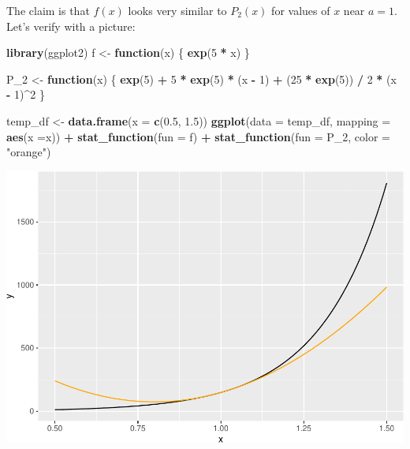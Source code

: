 \documentclass[]{article}
\newenvironment{Shaded}{\begin{snugshade}}{\end{snugshade}}
\newcommand{\KeywordTok}[1]{\textcolor[rgb]{0.13,0.29,0.53}{\textbf{#1}}}
\newcommand{\DataTypeTok}[1]{\textcolor[rgb]{0.13,0.29,0.53}{#1}}
\newcommand{\DecValTok}[1]{\textcolor[rgb]{0.00,0.00,0.81}{#1}}
\newcommand{\FloatTok}[1]{\textcolor[rgb]{0.00,0.00,0.81}{#1}}
\newcommand{\StringTok}[1]{\textcolor[rgb]{0.31,0.60,0.02}{#1}}
\newcommand{\ControlFlowTok}[1]{\textcolor[rgb]{0.13,0.29,0.53}{\textbf{#1}}}
\newcommand{\OperatorTok}[1]{\textcolor[rgb]{0.81,0.36,0.00}{\textbf{#1}}}
\newcommand{\NormalTok}[1]{#1}
\begin{document}
The claim is that \(f(x)\) looks very similar to \(P_2(x)\) for values
of \(x\) near \(a = 1\). Let's verify with a picture:

\begin{Shaded}
\begin{Highlighting}[]
\KeywordTok{library}\NormalTok{(ggplot2)}
\NormalTok{f <-}\StringTok{ }\ControlFlowTok{function}\NormalTok{(x) \{}
  \KeywordTok{exp}\NormalTok{(}\DecValTok{5} \OperatorTok{*}\StringTok{ }\NormalTok{x)}
\NormalTok{\}}

\NormalTok{P_}\DecValTok{2}\NormalTok{ <-}\StringTok{ }\ControlFlowTok{function}\NormalTok{(x) \{}
  \KeywordTok{exp}\NormalTok{(}\DecValTok{5}\NormalTok{) }\OperatorTok{+}\StringTok{ }\DecValTok{5} \OperatorTok{*}\StringTok{ }\KeywordTok{exp}\NormalTok{(}\DecValTok{5}\NormalTok{) }\OperatorTok{*}\StringTok{ }\NormalTok{(x }\OperatorTok{-}\StringTok{ }\DecValTok{1}\NormalTok{) }\OperatorTok{+}\StringTok{ }\NormalTok{(}\DecValTok{25} \OperatorTok{*}\StringTok{ }\KeywordTok{exp}\NormalTok{(}\DecValTok{5}\NormalTok{)) }\OperatorTok{/}\StringTok{ }\DecValTok{2} \OperatorTok{*}\StringTok{ }\NormalTok{(x }\OperatorTok{-}\StringTok{ }\DecValTok{1}\NormalTok{)}\OperatorTok{^}\DecValTok{2}
\NormalTok{\}}

\NormalTok{temp_df <-}\StringTok{ }\KeywordTok{data.frame}\NormalTok{(}\DataTypeTok{x =} \KeywordTok{c}\NormalTok{(}\FloatTok{0.5}\NormalTok{, }\FloatTok{1.5}\NormalTok{))}
\KeywordTok{ggplot}\NormalTok{(}\DataTypeTok{data =}\NormalTok{ temp_df, }\DataTypeTok{mapping =} \KeywordTok{aes}\NormalTok{(}\DataTypeTok{x =}\NormalTok{x)) }\OperatorTok{+}
\StringTok{  }\KeywordTok{stat_function}\NormalTok{(}\DataTypeTok{fun =}\NormalTok{ f) }\OperatorTok{+}
\StringTok{  }\KeywordTok{stat_function}\NormalTok{(}\DataTypeTok{fun =}\NormalTok{ P_}\DecValTok{2}\NormalTok{, }\DataTypeTok{color =} \StringTok{"orange"}\NormalTok{)}
\end{Highlighting}
\end{Shaded}

\includegraphics{calculus_files/figure-latex/unnamed-chunk-2-1.pdf}
\end{document}
